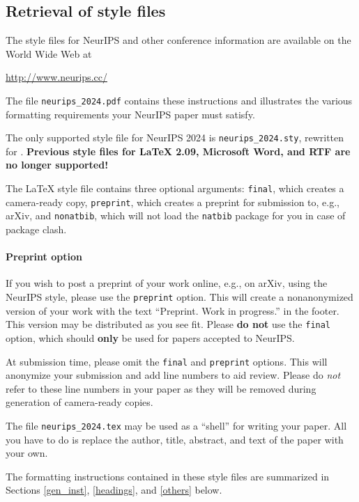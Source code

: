 \documentclass{article}
\begin{document}
\subsection{Retrieval of style files}


The style files for NeurIPS and other conference information are available on
the World Wide Web at
\begin{center}
  \url{http://www.neurips.cc/}
\end{center}
The file \verb+neurips_2024.pdf+ contains these instructions and illustrates the
various formatting requirements your NeurIPS paper must satisfy.


The only supported style file for NeurIPS 2024 is \verb+neurips_2024.sty+,
rewritten for \LaTeXe{}.  \textbf{Previous style files for \LaTeX{} 2.09,
  Microsoft Word, and RTF are no longer supported!}


The \LaTeX{} style file contains three optional arguments: \verb+final+, which
creates a camera-ready copy, \verb+preprint+, which creates a preprint for
submission to, e.g., arXiv, and \verb+nonatbib+, which will not load the
\verb+natbib+ package for you in case of package clash.


\paragraph{Preprint option}
If you wish to post a preprint of your work online, e.g., on arXiv, using the
NeurIPS style, please use the \verb+preprint+ option. This will create a
nonanonymized version of your work with the text ``Preprint. Work in progress.''
in the footer. This version may be distributed as you see fit. Please \textbf{do
  not} use the \verb+final+ option, which should \textbf{only} be used for
papers accepted to NeurIPS.


At submission time, please omit the \verb+final+ and \verb+preprint+
options. This will anonymize your submission and add line numbers to aid
review. Please do \emph{not} refer to these line numbers in your paper as they
will be removed during generation of camera-ready copies.


The file \verb+neurips_2024.tex+ may be used as a ``shell'' for writing your
paper. All you have to do is replace the author, title, abstract, and text of
the paper with your own.


The formatting instructions contained in these style files are summarized in
Sections \ref{gen_inst}, \ref{headings}, and \ref{others} below.
\end{document}
